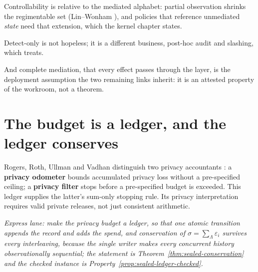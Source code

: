 \documentclass[11pt,a4paper]{article}
\theoremstyle{definition}
\begin{document}
\begin{pdboundary}
\setlength{\parskip}{4pt plus 1pt}
Controllability is relative to the mediated alphabet: partial observation
shrinks the regimentable set (Lin--Wonham ), and policies that
reference unmediated \emph{state} need that extension, which the kernel chapter
states.

Detect-only is not hopeless; it is a different business, post-hoc
audit and slashing, which  treats.

And
complete mediation, that every effect passes through the layer, is the
deployment assumption the two remaining links inherit: it is an attested
property of the workroom, not a theorem.
\end{pdboundary}


\section{The budget is a ledger, and the ledger conserves}\label{sec:sealed-conservation}

\noindent Rogers, Roth, Ullman and Vadhan distinguish two privacy accountants
: a \textbf{privacy odometer} bounds accumulated privacy loss
without a pre-specified ceiling; a \textbf{privacy filter} stops before a
pre-specified budget is exceeded. This ledger supplies the latter's sum-only
stopping rule. Its privacy interpretation requires valid private releases,
not just consistent arithmetic.

\noindent\emph{Express lane: make the privacy budget a ledger, so that one
atomic transition appends the record and adds the spend, and conservation of
$\sigma=\sum_\Lambda\varepsilon_i$ survives every interleaving, because the
single writer makes every concurrent history observationally sequential; the
statement is Theorem~\ref{thm:sealed-conservation} and the checked instance is
Property~\ref{prop:sealed-ledger-checked}.}
\end{document}
